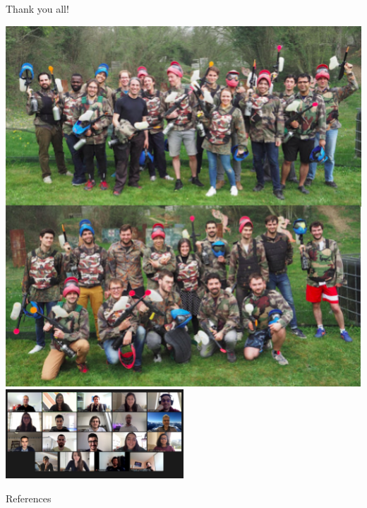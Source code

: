 \documentclass[aspectratio=169,xcolor=dvipsnames]{beamer}
\begin{document}
\begin{frame}{Thank you all!}
    \begin{center}
        \includegraphics[height=0.5\textheight]{Figures/parietal_2019.png}
        \includegraphics[width=0.5\textwidth]{Figures/cosmostat_zoom.jpeg}
    \end{center}
\end{frame}



\begin{frame}[allowframebreaks]{References}
    \printbibliography
\end{frame}
\end{document}
